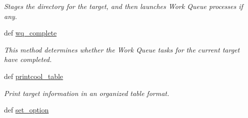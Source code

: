 \begin{DoxyCompactItemize}
\begin{DoxyCompactList}\small\item\em \-Stages the directory for the target, and then launches \-Work \-Queue processes if any. \end{DoxyCompactList}\item 
def \hyperlink{classforcebalance_1_1target_1_1Target_af6099ec09486213869dba2491bd8ea04}{wq\-\_\-complete}
\begin{DoxyCompactList}\small\item\em \-This method determines whether the \-Work \-Queue tasks for the current target have completed. \end{DoxyCompactList}\item 
def \hyperlink{classforcebalance_1_1target_1_1Target_ac30a4e9d7d9fe06f7caefa5f7cfab09b}{printcool\-\_\-table}
\begin{DoxyCompactList}\small\item\em \-Print target information in an organized table format. \end{DoxyCompactList}\item 
def \hyperlink{classforcebalance_1_1BaseClass_a73e9a37a7632e79eb99f49bd15aced45}{set\-\_\-option}
\end{DoxyCompactItemize}
